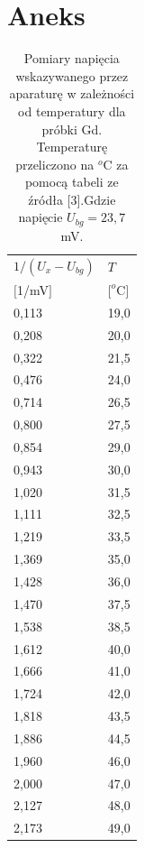 \documentclass[11pt]{article}
\begin{document}
\section*{Aneks}
\begin{table}[h!]
\centering
\caption{Pomiary napięcia wskazywanego przez aparaturę w zależności od temperatury dla próbki Gd. Temperaturę przeliczono na $^o$C za pomocą tabeli
ze źródła [3].Gdzie napięcie $U_{bg}=23,7$ mV.}
\label{2}
\begin{tabular}{|l|l|}
\hline
$1 /(U_{x}-U_{bg})$ & $T$ \\  
$[$1/mV$]$ & $[ ^o$C$]$ \\ \hline
0,113 & 19,0 \\ \hline
0,208 & 20,0 \\ \hline
0,322 & 21,5 \\ \hline
0,476 & 24,0 \\ \hline
0,714 & 26,5 \\ \hline
0,800 & 27,5 \\ \hline
0,854 & 29,0 \\ \hline
0,943 & 30,0 \\ \hline
1,020 & 31,5 \\ \hline
1,111 & 32,5 \\ \hline
1,219 & 33,5 \\ \hline
1,369 & 35,0 \\ \hline
1,428 & 36,0 \\ \hline
1,470 & 37,5 \\ \hline
1,538 & 38,5 \\ \hline
1,612 & 40,0 \\ \hline
1,666 & 41,0 \\ \hline
1,724 & 42,0 \\ \hline
1,818 & 43,5 \\ \hline
1,886 & 44,5 \\ \hline
1,960 & 46,0 \\ \hline
2,000 & 47,0 \\ \hline
2,127 & 48,0 \\ \hline
2,173 & 49,0 \\ \hline
\end{tabular}
\end{table}
\end{document}
